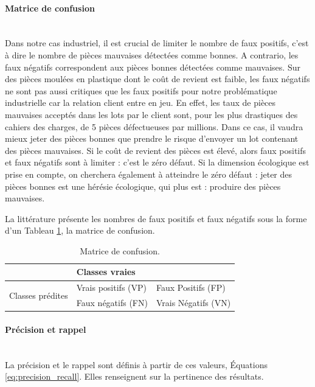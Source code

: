 \paragraph{Matrice de confusion}\mbox{} \\
Dans notre cas industriel, il est crucial de limiter le nombre de faux positifs, c'est à dire le nombre de pièces mauvaises détectées comme bonnes.
A contrario, les faux négatifs correspondent aux pièces bonnes détectées comme mauvaises.
Sur des pièces moulées en plastique dont le coût de revient est faible, les faux négatifs ne sont pas aussi critiques que les faux positifs pour notre problématique industrielle car la relation client entre en jeu.
En effet, les taux de pièces mauvaises acceptés dans les lots par le client sont, pour les plus drastiques des cahiers des charges, de 5 pièces défectueuses par millions.
Dans ce cas, il vaudra mieux jeter des pièces bonnes que prendre le risque d'envoyer un lot contenant des pièces mauvaises.
Si le coût de revient des pièces est élevé, alors faux positifs et faux négatifs sont à limiter : c'est le zéro défaut.
Si la dimension écologique est prise en compte, on cherchera également à atteindre le zéro défaut : jeter des pièces bonnes est une hérésie écologique, qui plus est : produire des pièces mauvaises.

La littérature présente les nombres de faux positifs et faux négatifs sous la forme d'un Tableau \ref{tab:confusion_matrix}, la matrice de confusion.

\begin{table}[]
    \centering
    \begin{tabular}{l|l|l|}
        \cline{2-3}
        & \multicolumn{2}{l|}{Classes vraies}               \\ \hline
        \multicolumn{1}{|l|}{\multirow{2}{*}{Classes prédites}} & Vrais positifs (VP) & Faux Positifs (FP)  \\ \cline{2-3} 
        \multicolumn{1}{|l|}{}                            & Faux négatifs (FN)  & Vrais Négatifs (VN) \\ \hline
    \end{tabular}
    \caption{Matrice de confusion.}
    \label{tab:confusion_matrix}
\end{table}

\paragraph{Précision et rappel}\mbox{} \\
La précision et le rappel sont définis à partir de ces valeurs, Équations \ref{eq:precision_recall}.
Elles renseignent sur la pertinence des résultats.

